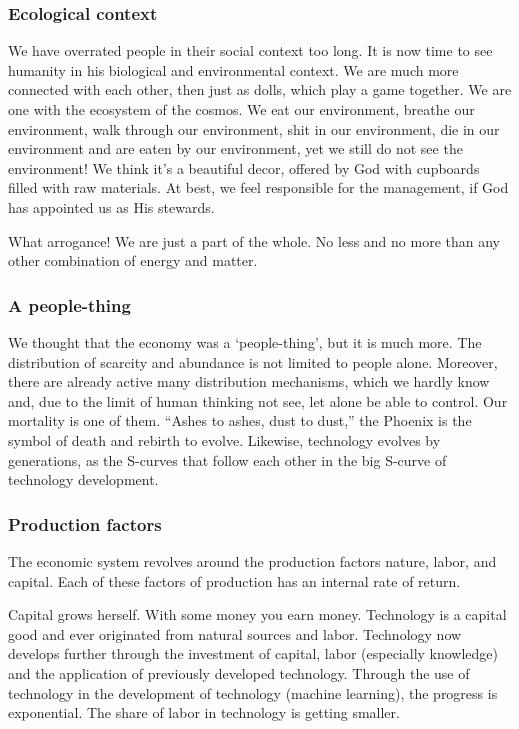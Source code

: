\documentclass[11pt]{article}
\begin{document}
\subsubsection{Ecological context}
\label{sec:orgcd9f482}

We have overrated people in their social context too long. It is now time to see humanity in his biological and environmental context. We are much more connected with each other, then just as dolls, which play a game together. We are one with the ecosystem of the cosmos. We eat our environment, breathe our environment, walk through our environment, shit in our environment, die in our environment and are eaten by our environment, yet we still do not see the environment! We think it’s a beautiful decor, offered by God with cupboards filled with raw materials. At best, we feel responsible for the management, if God has appointed us as His stewards.

What arrogance! We are just a part of the whole. No less and no more than any other combination of energy and matter.

\subsubsection{A people-thing}
\label{sec:org62e6ef1}

We thought that the economy was a ‘people-thing’, but it is much more. The distribution of scarcity and abundance is not limited to people alone. Moreover, there are already active many distribution mechanisms, which we hardly know and, due to the limit of human thinking not see, let alone be able to control. Our mortality is one of them. “Ashes to ashes, dust to dust,” the Phoenix is ​​the symbol of death and rebirth to evolve. Likewise, technology evolves by generations, as the S-curves that follow each other in the big S-curve of technology development.

\subsubsection{Production factors}
\label{sec:org797ddc0}

The economic system revolves around the production factors nature, labor, and capital. Each of these factors of production has an internal rate of return.

Capital grows herself. With some money you earn money. Technology is a capital good and ever originated from natural sources and labor. Technology now develops further through the investment of capital, labor (especially knowledge) and the application of previously developed technology. Through the use of technology in the development of technology (machine learning), the progress is exponential. The share of labor in technology is getting smaller.
\end{document}
